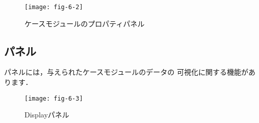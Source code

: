 \begin{figure}[ht]
 \texttt{[image: fig-6-2]}
 \caption{ケースモジュールのプロパティパネル}
 \label{fig:6.2}
\end{figure}


\subsection{パネル}
\label{ssec:6.1.3}
%
%
パネルには，与えられたケースモジュールのデータの
可視化に関する機能があります．


\begin{figure}[ht]
 \texttt{[image: fig-6-3]}
 \caption{Displayパネル}
 \label{fig:6.3}
\end{figure}


